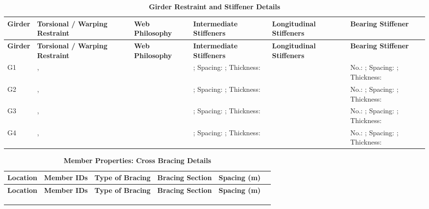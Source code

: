\documentclass[12pt,a4paper]{report}
\numberwithin{table}{chapter}
\numberwithin{figure}{chapter}
\newcommand{\reportrowpad}{4pt}
\newcommand{\reportsmallgap}{0.4em}
\newcommand{\reportcaptiongap}{4pt}
\newcommand{\reporttabcolsep}{3pt}
\begin{document}
\vspace{\reportcaptiongap}
\begin{longtable}{|L{1.4cm}|p{2.2cm}|p{2.2cm}|p{3.0cm}|p{2.4cm}|p{2.2cm}|}
\caption{\textbf{Girder Restraint and Stiffener Details}}\\
\hline
\textbf{Girder} & \textbf{Torsional / Warping Restraint} & \textbf{Web Philosophy} & \textbf{Intermediate Stiffeners} & \textbf{Longitudinal Stiffeners} & \textbf{Bearing Stiffener} \\[\reportrowpad]
\hline
\endfirsthead
\hline
\textbf{Girder} & \textbf{Torsional / Warping Restraint} & \textbf{Web Philosophy} & \textbf{Intermediate Stiffeners} & \textbf{Longitudinal Stiffeners} & \textbf{Bearing Stiffener} \\[\reportrowpad]
\hline
\endhead

G1 & ,  &  & ; Spacing: ; Thickness:  &  & No.: ; Spacing: ; Thickness:  \\[8pt]
\hline
G2 & ,  &  & ; Spacing: ; Thickness:  &  & No.: ; Spacing: ; Thickness:  \\[8pt]
\hline
G3 & ,  &  & ; Spacing: ; Thickness:  &  & No.: ; Spacing: ; Thickness:  \\[8pt]
\hline
G4 & ,  &  & ; Spacing: ; Thickness:  &  & No.: ; Spacing: ; Thickness:  \\[8pt]
\hline
\end{longtable}



\newpage

\vspace{\reportsmallgap}
\setlength{\tabcolsep}{\reporttabcolsep}
\setlength\LTleft{0pt}
\setlength\LTright{\fill}

\begin{longtable}{|L{2.2cm}|L{2.2cm}|L{3.0cm}|L{2.5cm}|C{1.8cm}|C{1.8cm}|}
\caption{\textbf{Member Properties: Cross Bracing Details}}\\
\hline
\textbf{Location} & \textbf{Member IDs} & \textbf{Type of Bracing} & \textbf{Bracing Section} & \textbf{Spacing (m)} \\
\hline
\endfirsthead
\hline
\textbf{Location} & \textbf{Member IDs} & \textbf{Type of Bracing} & \textbf{Bracing Section} & \textbf{Spacing (m)} \\
\hline
\endhead
 &  &  &  &  \\[\reportrowpad]
\hline
 &  &  &  &  \\[\reportrowpad]
\hline
 &  &  &  &  \\[\reportrowpad]
\hline
\end{longtable}
\end{document}
